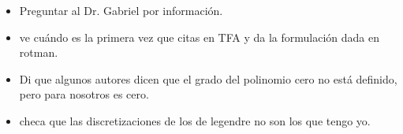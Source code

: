 \begin{itemize}
\item Preguntar al Dr. Gabriel por información.

\item ve cuándo es la primera vez que citas en TFA y da la
formulación dada en rotman.

\item Di que algunos autores dicen que el grado del polinomio
cero no está definido, pero para nosotros es cero.

\item checa que las discretizaciones de los de legendre no son
los que tengo yo.

\end{itemize}

\newpage